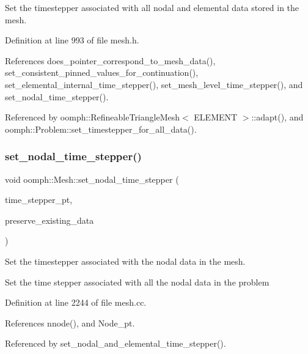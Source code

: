 Set the timestepper associated with all nodal and elemental data stored in the mesh. 



Definition at line 993 of file mesh.\+h.



References does\+\_\+pointer\+\_\+correspond\+\_\+to\+\_\+mesh\+\_\+data(), set\+\_\+consistent\+\_\+pinned\+\_\+values\+\_\+for\+\_\+continuation(), set\+\_\+elemental\+\_\+internal\+\_\+time\+\_\+stepper(), set\+\_\+mesh\+\_\+level\+\_\+time\+\_\+stepper(), and set\+\_\+nodal\+\_\+time\+\_\+stepper().



Referenced by oomph\+::\+Refineable\+Triangle\+Mesh$<$ E\+L\+E\+M\+E\+N\+T $>$\+::adapt(), and oomph\+::\+Problem\+::set\+\_\+timestepper\+\_\+for\+\_\+all\+\_\+data().

\mbox{\label{classoomph_1_1Mesh_ac40c947d8ffe5b14aa6ac77fc398f3ec}} 
\subsubsection{\texorpdfstring{set\+\_\+nodal\+\_\+time\+\_\+stepper()}{set\_nodal\_time\_stepper()}}
{\footnotesize\ttfamily void oomph\+::\+Mesh\+::set\+\_\+nodal\+\_\+time\+\_\+stepper (\begin{DoxyParamCaption}\item[{\hyperlink{classoomph_1_1TimeStepper}{Time\+Stepper} $\ast$const \&}]{time\+\_\+stepper\+\_\+pt,  }\item[{const bool \&}]{preserve\+\_\+existing\+\_\+data }\end{DoxyParamCaption})}



Set the timestepper associated with the nodal data in the mesh. 

Set the time stepper associated with all the nodal data in the problem 

Definition at line 2244 of file mesh.\+cc.



References nnode(), and Node\+\_\+pt.



Referenced by set\+\_\+nodal\+\_\+and\+\_\+elemental\+\_\+time\+\_\+stepper().

